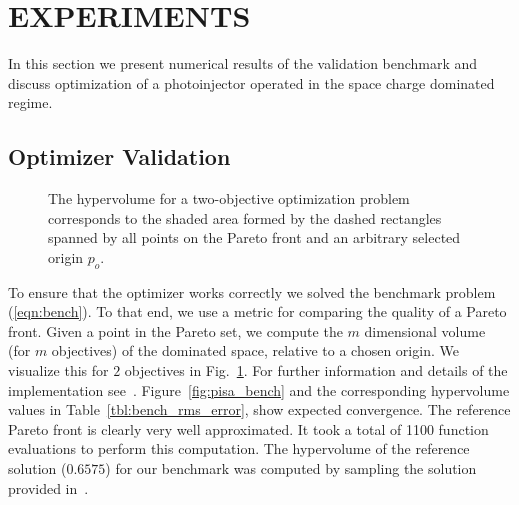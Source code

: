 \section{EXPERIMENTS} \label{sec:experiments}

In this section we present numerical results of the validation benchmark and
  discuss optimization of a photoinjector operated in the space charge dominated regime.

\subsection{Optimizer Validation}

\begin{figure}
    \centering
    \begin{tikzpicture}[text=black]
      
    \end{tikzpicture}
  \caption{The hypervolume for a two-objective optimization problem
  corresponds to the shaded area formed by the dashed rectangles spanned by
  all points on the Pareto front and an arbitrary selected origin $p_o$.}
  \label{fig:hypervolume}
\end{figure}

To ensure that the optimizer works correctly we solved the benchmark
  problem (\ref{eqn:bench}).
To that end, we use a metric for comparing the quality of a Pareto
  front.
Given a point in the Pareto set, we compute the $m$ dimensional volume (for
  $m$ objectives) of the dominated space, relative to a chosen origin.
We visualize this for $2$ objectives in Fig.~\ref{fig:hypervolume}.
For further information and details of the implementation see~\cite{whbb:12}.
Figure~\ref{fig:pisa_bench} and the corresponding hypervolume values in
  Table~\ref{tbl:bench_rms_error}, show expected convergence.
The reference Pareto front is clearly very well approximated.
It took a total of 1100 function evaluations to perform this computation.
The hypervolume of the reference solution ($0.6575$) for our benchmark was
  computed by sampling the solution provided in~\cite{hbwh:05}.

